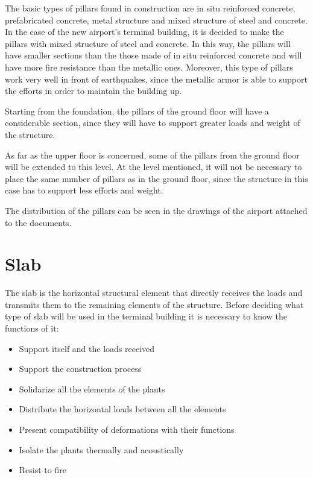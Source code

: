 The basic types of pillars found in construction are in situ reinforced concrete, prefabricated concrete, metal structure and mixed structure of steel and concrete. In the case of the new airport's terminal building, it is decided to make the pillars with mixed structure of steel and concrete. In this way, the pillars will have smaller sections than the those made of in situ reinforced concrete and will have more fire resistance than the metallic ones. Moreover, this type of pillars work very well in front of earthquakes, since the metallic armor is able to support the efforts in order to maintain the building up.

Starting from the foundation, the pillars of the ground floor will have a considerable section, since they will have to support greater loads and  weight of the structure.

As far as the upper floor is concerned, some of the pillars from the ground floor will be extended to this level. At the level mentioned, it will not be necessary to place the same number of pillars as in the ground floor, since the structure in this case has to support less efforts and weight.

The distribution of the pillars can be seen in the drawings of the airport attached to the documents.

	\section{Slab}
The slab is the horizontal structural element that directly receives the loads and transmits them to the remaining elements of the structure. Before deciding what type of slab will be used in the terminal building it is necessary to know the
functions of it:

\begin{itemize}
		\item Support itself and the loads received
		\item Support the construction process
		\item Solidarize all the elements of the plants
		\item Distribute the horizontal loads between all the elements
		\item Present compatibility of deformations with their functions
		\item Isolate the plants thermally and acoustically
		\item Resist to fire
\end{itemize}

